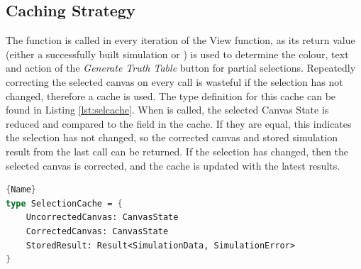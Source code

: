\subsection{Caching Strategy}
The function  is called in every iteration of the View function, as its return value (either a successfully built simulation or ) is used to determine the colour, text and action of the \textit{Generate Truth Table} button for partial selections. Repeatedly correcting the selected canvas on every call is wasteful if the selection has not changed, therefore a cache is used. The type definition for this cache can be found in Listing  \ref{lst:selcache}. When  is called, the selected Canvas State is reduced and compared to the  field in the cache. If they are equal, this indicates the selection has not changed, so the corrected canvas and stored simulation result from the last call can be returned. If the selection has changed, then the selected canvas is corrected, and the cache is updated with the latest results.

\begin{lstlisting}[caption=Type Definition of Cache for selected logic ,frame=tlrb, language=FSharp, label=lst:selcache]{Name}
type SelectionCache = {
    UncorrectedCanvas: CanvasState
    CorrectedCanvas: CanvasState
    StoredResult: Result<SimulationData, SimulationError>
}
\end{lstlisting}

